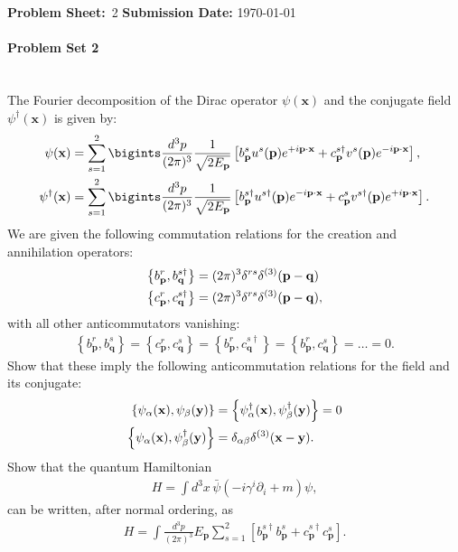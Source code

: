 {\large\textbf{Problem Sheet:}\ \textsc{2} \hspace{\hfill} \large\textbf{Submission Date:} \today\\
	\hline\hline
\paragraph*{Problem Set 2} %
\\
The Fourier decomposition of the Dirac operator $\psi(\mathbf{x})$ and the conjugate field $\psi^\dagger(\mathbf{x})$ is given by:
\begin{align}
    \psi(\mathbf{x}) &= \sum_{s=1}^2 \bigints\frac{d^3p}{(2\pi)^3} \frac{1}{\sqrt{2E_{\mathbf{p}}}} \left[ b^s_{\mathbf{p}} u^s(\mathbf{p}) e^{+i\mathbf{p}\cdot\mathbf{x}} + c^{s\dagger}_{\mathbf{p}} v^s(\mathbf{p}) e^{-i\mathbf{p}\cdot\mathbf{x}} \right], \\
    \psi^\dagger(\mathbf{x}) &= \sum_{s=1}^2 \bigints\frac{d^3p}{(2\pi)^3} \frac{1}{\sqrt{2E_{\mathbf{p}}}} \left[ b^{s\dagger}_{\mathbf{p}} u^{s\dagger}(\mathbf{p}) e^{-i\mathbf{p}\cdot\mathbf{x}} + c^s_{\mathbf{p}} v^{s\dagger}(\mathbf{p}) e^{+i\mathbf{p}\cdot\mathbf{x}} \right].
\end{align}
We are given the following commutation relations for the creation and annihilation operators:
\begin{align}
    \left\{b^r_{\mathbf{p}}, b^{s\dagger}_{\mathbf{q}}\right\} &= (2\pi)^3 \delta^{rs} \delta^{(3)}(\mathbf{p} - \mathbf{q})\notag\\
    \left\{c^r_{\mathbf{p}}, c^{s\dagger}_{\mathbf{q}}\right\} &= (2\pi)^3 \delta^{rs} \delta^{(3)}(\mathbf{p} - \mathbf{q}),
\end{align}
with all other anticommutators vanishing:
\begin{align}
    \left\{b^r_{\mathbf{p}}, b^s_{\mathbf{q}}\right\} = \left\{c^r_{\mathbf{p}}, c^s_{\mathbf{q}}\right\} = \left\{b^r_{\mathbf{p}}, c^{s\dagger}_{\mathbf{q}}\right\} = \left\{b^r_{\mathbf{p}}, c^s_{\mathbf{q}}\right\} = \dots = 0.
\end{align}
Show that these imply the following anticommutation relations for the field and its conjugate:
\begin{align}
    \left\{\psi_\alpha(\mathbf{x}), \psi_\beta(\mathbf{y})\right\} &= \left\{\psi^\dagger_\alpha(\mathbf{x}), \psi^\dagger_\beta(\mathbf{y})\right\} = 0\notag\\
    \left\{\psi_\alpha(\mathbf{x}), \psi^\dagger_\beta(\mathbf{y})\right\} &= \delta_{\alpha\beta} \delta^{(3)}(\mathbf{x} - \mathbf{y}).
\end{align}
Show that the quantum Hamiltonian
\begin{align}
    H = \int d^3x \, \bar{\psi}(-i\gamma^i \partial_i + m)\psi,
\end{align}
can be written, after normal ordering, as
\begin{align}
    H = \int \frac{d^3p}{(2\pi)^3} E_{\mathbf{p}} \sum_{s=1}^2 \left[ b^{s\dagger}_{\mathbf{p}} b^s_{\mathbf{p}} + c^{s\dagger}_{\mathbf{p}} c^s_{\mathbf{p}} \right].
\end{align}
\bigskip\bigskip\hline\hline\bigskip
}
